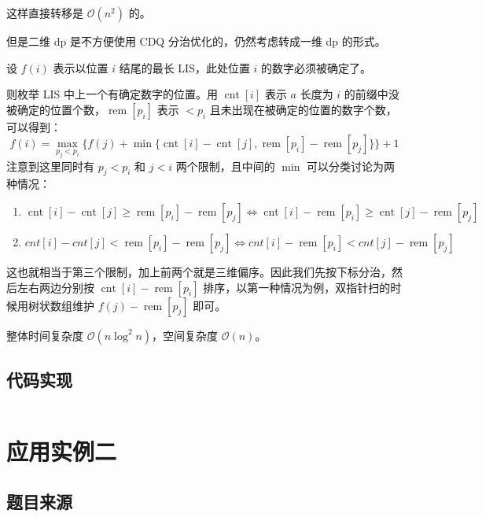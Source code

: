 这样直接转移是 \(\mathcal{O}(n^2)\) 的。

但是二维 dp 是不方便使用 CDQ 分治优化的，仍然考虑转成一维 dp 的形式。

设 \(f(i)\) 表示以位置 \(i\) 结尾的最长 LIS，此处位置 \(i\)
的数字必须被确定了。

则枚举 LIS 中上一个有确定数字的位置。用 \(\operatorname{cnt}[i]\) 表示
\(a\) 长度为 \(i\)
的前缀中没被确定的位置个数，\(\operatorname{rem}[p_i]\) 表示 \(< p_i\)
且未出现在被确定的位置的数字个数，可以得到： \[
f(i)=\max_{p_j < p_i}\{f(j)+\min\{\operatorname{cnt}[i]-\operatorname{cnt}[j],\operatorname{rem}[p_i]-\operatorname{rem}[p_j]\}\}+1
\] 注意到这里同时有 \(p_j<p_i\) 和 \(j<i\) 两个限制，且中间的 \(\min\)
可以分类讨论为两种情况：

\begin{enumerate}
\def\labelenumi{\arabic{enumi}.}

\item
  \(\operatorname{cnt}[i]-\operatorname{cnt}[j]\geq\operatorname{rem}[p_i]-\operatorname{rem}[p_j] \iff \operatorname{cnt}[i]-\operatorname{rem}[p_i]\geq\operatorname{cnt}[j]-\operatorname{rem}[p_j]\)
\item
  \(cnt[i]-cnt[j]<\operatorname{rem}[p_i]-\operatorname{rem}[p_j] \iff cnt[i]-\operatorname{rem}[p_i]<cnt[j]-\operatorname{rem}[p_j]\)
\end{enumerate}

这也就相当于第三个限制，加上前两个就是三维偏序。因此我们先按下标分治，然后左右两边分别按
\(\operatorname{cnt}[i]-\operatorname{rem}[p_i]\)
排序，以第一种情况为例，双指针扫的时候用树状数组维护
\(f(j)-\operatorname{rem}[p_j]\) 即可。

整体时间复杂度 \(\mathcal{O}(n \log^2 n)\)，空间复杂度
\(\mathcal{O}(n)\)。

\subsection{代码实现}

\inputminted[frame=lines, numbers=left, fontsize=\footnotesize, tabsize=4, breaklines=true]{c++}{code/9.cpp}

\section{应用实例二}

\subsection{题目来源}

